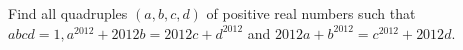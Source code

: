 Find all quadruples $(a,b,c,d)$ of positive real numbers such that $abcd=1,a^{2012}+2012b=2012c+d^{2012}$ and $2012a+b^{2012}=c^{2012}+2012d$.